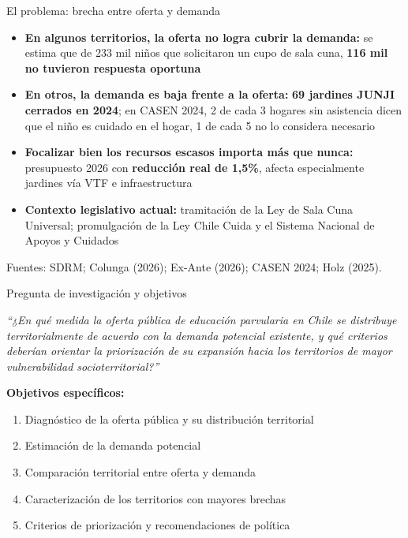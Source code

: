 \documentclass[aspectratio=169,10pt]{beamer}
\newcommand{\fuentes}[1]{%
  \vfill{\color{graytext}\scriptsize Fuentes: #1.}%
}
\newcommand{\destacar}[1]{\textcolor{steel}{\textbf{#1}}}
\begin{document}
\begin{frame}{El problema: brecha entre oferta y demanda}
  \small
  \begin{itemize}
    \item \textbf{En algunos territorios, la oferta no logra cubrir la demanda:} se estima que de 233 mil niños que solicitaron un cupo de sala cuna, \destacar{116 mil no tuvieron respuesta oportuna}
    \item \textbf{En otros, la demanda es baja frente a la oferta:} \destacar{69 jardines JUNJI cerrados en 2024}; en CASEN 2024, 2 de cada 3 hogares sin asistencia dicen que el niño es cuidado en el hogar, 1 de cada 5 no lo considera necesario
    \item \textbf{Focalizar bien los recursos escasos importa más que nunca:} presupuesto 2026 con \destacar{reducción real de 1,5\%}, afecta especialmente jardines vía VTF e infraestructura
    \item \textbf{Contexto legislativo actual:} tramitación de la Ley de Sala Cuna Universal; promulgación de la Ley Chile Cuida y el Sistema Nacional de Apoyos y Cuidados
  \end{itemize}
  \fuentes{SDRM; Colunga (2026); Ex-Ante (2026); CASEN 2024; Holz (2025)}
\end{frame}

\begin{frame}{Pregunta de investigación y objetivos}
  \begin{center}
    {\itshape ``¿En qué medida la oferta pública de educación parvularia en Chile se distribuye territorialmente de acuerdo con la demanda potencial existente, y qué criterios deberían orientar la priorización de su expansión hacia los territorios de mayor vulnerabilidad socioterritorial?''}
  \end{center}
  \vspace{6pt}
  \textbf{Objetivos específicos:}
  \begin{enumerate}
    \item Diagnóstico de la oferta pública y su distribución territorial
    \item Estimación de la demanda potencial
    \item Comparación territorial entre oferta y demanda
    \item Caracterización de los territorios con mayores brechas
    \item Criterios de priorización y recomendaciones de política
  \end{enumerate}
\end{frame}
\end{document}
